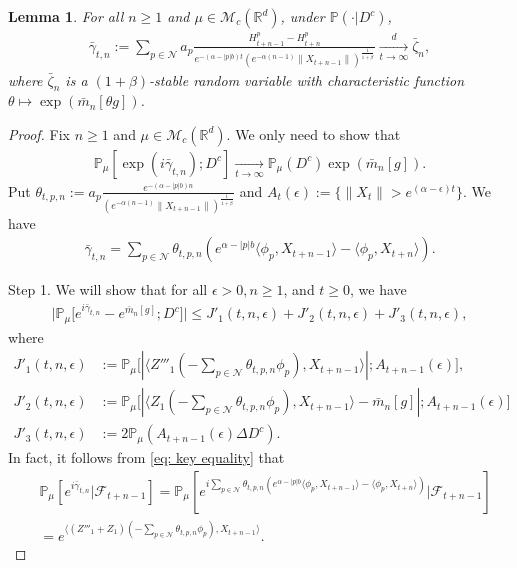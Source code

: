 \documentclass[12pt,a4paper]{amsart}
\theoremstyle{plain}
\newtheorem{lem}[thm]{Lemma}
\theoremstyle{definition}
\numberwithin{equation}{section}
\begin{document}
\begin{lem}
  \label{large-central}
  For all $n\ge 1$ and $\mu\in\mathcal{M}_c(\mathbb{R}^d)$, under $\mathbb{P}(\cdot|D^c)$,
\begin{align}
  \bar{\gamma}_{t,n}
  := \sum_{p\in\mathcal{N}} a_p \frac { H^p_{t+n-1} - H^p_{t+n} } { e^{ - ( \alpha - | p | b ) t } ( e^{ - \alpha ( n - 1 ) } \| X_{ t + n - 1 } \| )^{ \frac { 1 } { 1 + \beta } } }
  \xrightarrow[t\to \infty]{d}\bar{\zeta}_n,
\end{align}
	where $\bar{\zeta}_n$ is a $(1+\beta)$-stable random variable with characteristic function $\theta\mapsto \exp(\bar{m}_n[\theta g])$.
\end{lem}
\begin{proof}
  Fix $n\ge 1$ and $\mu\in\mathcal{M}_c(\mathbb{R}^d)$.
  We only need to show that
  \begin{align}
    \mathbb{P}_{\mu}[\exp(i\bar{\gamma}_{t,n}); D^c]
    \xrightarrow[t\rightarrow \infty]{}\mathbb{P}_{\mu}(D^c)\exp(\bar{m}_n[g]).
  \end{align}
  Put $ \theta_{ t, p, n} := a_p \frac { e^{ - ( \alpha - | p | b ) n } } { ( e^{ - \alpha ( n - 1 ) } \| X_{ t + n - 1 } \| )^{ \frac { 1 } { 1 + \beta } } } $ and $ A_t(\epsilon):=\{\|X_t\| > e^{(\alpha-\epsilon)t}\}$.
  We have
  \begin{align}
    \bar{\gamma}_{t,n}
    =\sum_{p\in \mathcal{N}}\theta_{t,p,n}(e^{\alpha-|p|b}\langle \phi_p, X_{t+n-1}\rangle-\langle \phi_p, X_{t+n}\rangle).
  \end{align}

	Step 1. We will show that for all $\epsilon > 0, n\geq 1$, and $t\geq 0$, we have
  \begin{align}
    \big|\mathbb{P}_{\mu}\big[e^{i\bar{\gamma}_{t,n}}-e^{\bar{m}_n[g]}; D^c\big]\big|
    \leq J'_1(t,n,\epsilon)+J'_2(t,n,\epsilon)+J'_3(t,n,\epsilon),
  \end{align}
	where
  \begin{align}
    \label{eq: Def of JJ1}
    J'_1(t,n,\epsilon)
    & := \mathbb{P}_{\mu}\big[|\langle Z'''_1(-\sum_{p\in \mathcal{N}}\theta_{t,p,n}\phi_p), X_{t+n-1}\rangle|; A_{t+n-1}(\epsilon) \big], \\ 
    J'_2(t,n,\epsilon)
    & := \mathbb{P}_{\mu}\big[|\langle Z_1(-\sum_{p\in \mathcal{N}}\theta_{t,p,n}\phi_p),X_{t+n-1}\rangle-\bar{m}_n[g]|; A_{t+n-1}(\epsilon)\big] \\
    J'_3(t,n, \epsilon)
    & := 2\mathbb{P}_{\mu}(A_{t+n-1}(\epsilon)\Delta D^c).
  \end{align}
  In fact, it follows from \eqref{eq: key equality} that
  \begin{align}
    \label{eq: need11}
    & \displaystyle\mathbb{P}_{\mu}[e^{i\bar{\gamma}_{t,n}}|\mathscr{F}_{t+n-1}]
      = \mathbb{P}_{\mu}[e^{i\sum_{p\in \mathcal{N}}\theta_{t,p,n}(e^{\alpha-|p|b}\langle \phi_p,X_{t+n-1}\rangle-\langle \phi_p, X_{t+n}\rangle)}|\mathscr{F}_{t+n-1}] \\
    & = \displaystyle e^{\langle (Z'''_1+Z_1)(-\sum_{p\in \mathcal{N}}\theta_{t,p,n}\phi_p), X_{t+n-1} \rangle}.
  \end{align}


\end{proof}
\end{document}
